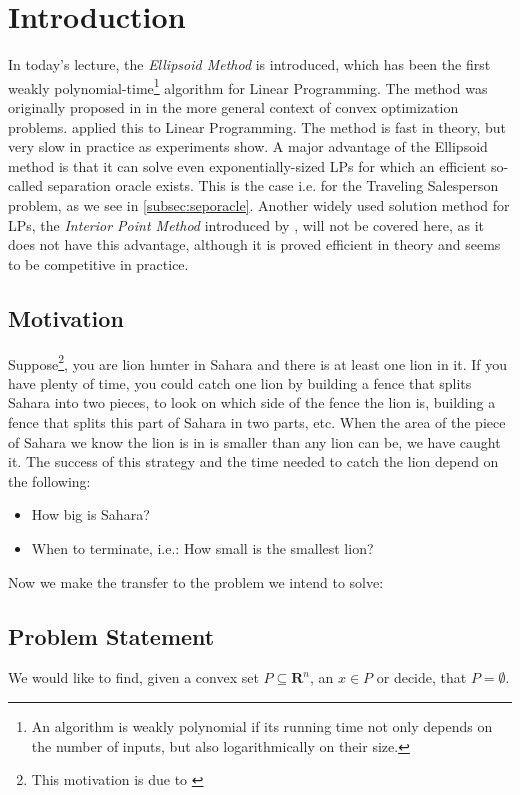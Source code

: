 \documentclass[10pt]{article}
\newcommand{\R}{\mathbf{R}}
\begin{document}


\section{Introduction}
In today's lecture, the \emph{Ellipsoid Method} is introduced, which has been the first weakly polynomial-time\footnote{An algorithm is weakly polynomial if its running time not only depends on the number of inputs, but also logarithmically on their size.} algorithm for Linear Programming. The method was originally proposed in \cite{shor77} in the more general context of convex optimization problems. \cite{khachiyan79} applied this to Linear Programming. The method is fast in theory, but very slow in practice as experiments show. A major advantage of the Ellipsoid method is that it can solve even exponentially-sized LPs for which an efficient so-called separation oracle exists. This is the case i.e. for the Traveling Salesperson problem, as we see in \autoref{subsec:seporacle}. Another widely used solution method for LPs, the \emph{Interior Point Method} introduced by \cite{karmarkar89}, will not be covered here, as it does not have this advantage, although it is proved efficient in theory and seems to be competitive in practice. 
\subsection{Motivation}\label{sec:motivation}
Suppose\footnote{This motivation is due to \protect\cite{lovaszschrijver}}, you are lion hunter in Sahara and there is at least one lion in it. If you have plenty of time, you could catch one lion by building a fence that splits Sahara into two pieces, to look on which side of the fence the lion is, building a fence that splits this part of Sahara in two parts, etc. When the area of the piece of Sahara we know the lion is in is smaller than any lion can be, we have caught it. The success of this strategy and the time needed to catch the lion depend on the following:
\begin{itemize}
\item How big is Sahara?
\item When to terminate, i.e.: How small is the smallest lion?
\end{itemize}
Now we make the transfer to the problem we intend to solve:
\subsection{Problem Statement}
We would like to find, given a convex set $P\subseteq \R^n$, an $x \in P$ or decide, that $P = \emptyset$.
\end{document}
